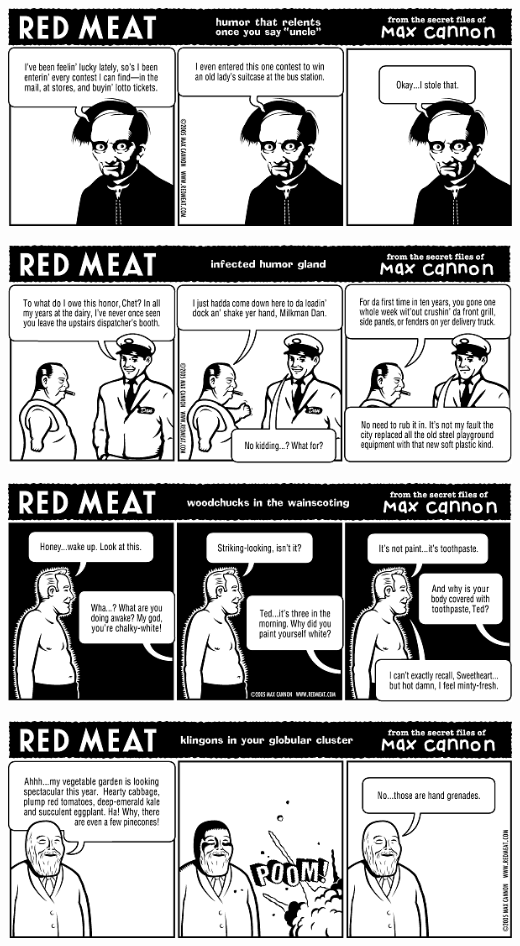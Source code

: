 \documentclass[a4paper,twoside,11pt]{article}
\begin{document}
\includegraphics[width=\textwidth]{redmeat_2005-03-15.png}



\includegraphics[width=\textwidth]{redmeat_2005-03-22.png}



\includegraphics[width=\textwidth]{redmeat_2005-03-29.png}



\includegraphics[width=\textwidth]{redmeat_2005-04-05.png}
\end{document}
